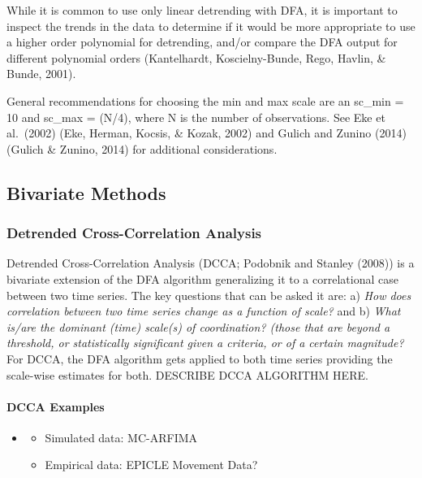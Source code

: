 \documentclass[
  english,
  man]{apa6}
\providecommand{\tightlist}{%
  \setlength{\itemsep}{0pt}\setlength{\parskip}{0pt}}
\let\oldparagraph\paragraph
\renewcommand{\paragraph}[1]{\oldparagraph{#1}\mbox{}}
\begin{document}
While it is common to use only linear detrending with DFA, it is
important to inspect the trends in the data to determine if it would be
more appropriate to use a higher order polynomial for detrending, and/or
compare the DFA output for different polynomial orders
(Kantelhardt, Koscielny-Bunde, Rego, Havlin, \& Bunde, 2001).

General recommendations for choosing the min and max scale are an sc\_min
= 10 and sc\_max = (N/4), where N is the number of observations. See Eke
et al.~(2002) (Eke, Herman, Kocsis, \& Kozak, 2002) and Gulich and
Zunino (2014) (Gulich \& Zunino, 2014) for additional
considerations.

\hypertarget{bivariate-methods}{%
\subsection{Bivariate Methods}\label{bivariate-methods}}

\hypertarget{detrended-cross-correlation-analysis}{%
\subsubsection{Detrended Cross-Correlation Analysis}\label{detrended-cross-correlation-analysis}}

Detrended Cross-Correlation Analysis (DCCA;
Podobnik and Stanley (2008)) is a bivariate extension
of the DFA algorithm generalizing it to a correlational case between two
time series. The key questions that can be asked it are: a) \emph{How does
correlation between two time series change as a function of scale?} and
b) \emph{What is/are the dominant (time) scale(s) of coordination? (those
that are beyond a threshold, or statistically significant given a
criteria, or of a certain magnitude?} For DCCA, the DFA algorithm gets
applied to both time series providing the scale-wise estimates for both.
DESCRIBE DCCA ALGORITHM HERE.

\hypertarget{dcca-examples}{%
\paragraph{DCCA Examples}\label{dcca-examples}}

\begin{itemize}
\item
  \begin{itemize}
  \tightlist
  \item
    Simulated data: MC-ARFIMA
  \item
    Empirical data: EPICLE Movement Data?
  \end{itemize}
\end{itemize}
\end{document}
